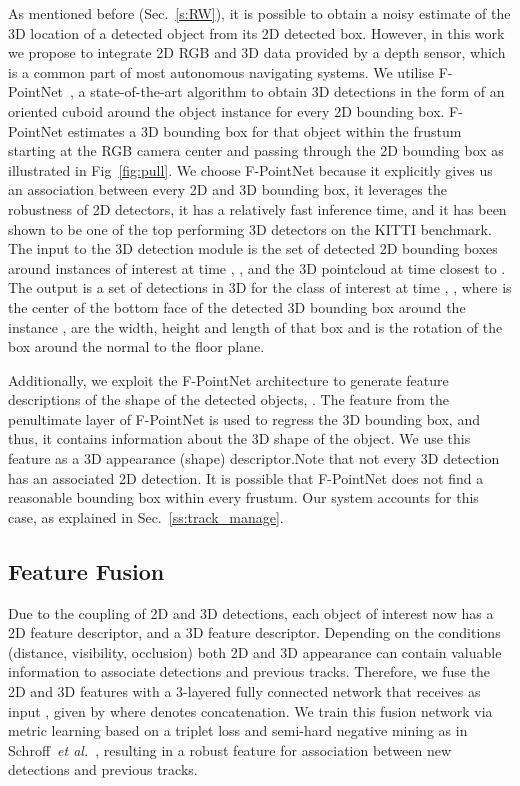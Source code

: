 \documentclass[letterpaper, 10 pt, conference]{ieeeconf}
\newcommand{\etal}{\emph{et al.}\xspace}
\begin{document}
As mentioned before (Sec.~\ref{s:RW}), it is possible to obtain a noisy estimate of the 3D location of a detected object from its 2D detected box. However, in this work we propose to integrate 2D RGB and 3D data provided by a depth sensor, which is a common part of most autonomous navigating systems. 
We utilise F-PointNet~\cite{DBLP:journals/corr/abs-1711-08488}, a state-of-the-art algorithm to obtain 3D detections in the form of an oriented cuboid around the object instance for every 2D bounding box. F-PointNet estimates a 3D bounding box for that object within the frustum starting at the RGB camera center and passing through the 2D bounding box as illustrated in Fig~\ref{fig:pull}. We choose F-PointNet because it explicitly gives us an association between every 2D and 3D bounding box, it leverages the robustness of 2D detectors, it has a relatively fast inference time, and it has been shown to be one of the top performing 3D detectors on the KITTI benchmark.
The input to the 3D detection module is the set of detected 2D bounding boxes around instances of interest at time , , and the 3D pointcloud at time closest to . 
The output is a set of  detections in 3D for the class of interest at time , , where  is the center of the bottom face of the detected 3D bounding box around the instance ,  are the width, height and length of that box and  is the rotation of the box around the normal to the floor plane.

Additionally, we exploit the F-PointNet architecture to generate feature descriptions of the shape of the detected objects, .
The feature from the penultimate layer of F-PointNet is used to regress the 3D bounding box, and thus, it contains information about the 3D shape of the object. We use this feature as a 3D appearance (shape) descriptor.Note that not every 3D detection has an associated 2D detection. It is possible that F-PointNet does not find a reasonable bounding box within every frustum. Our system accounts for this case, as explained in Sec.~\ref{ss:track_manage}.




\subsection{Feature Fusion}
\label{ss:ff}

Due to the coupling of 2D and 3D detections, each object of interest now has a 2D feature descriptor, and a 3D feature descriptor. Depending on the conditions (distance, visibility, occlusion) both 2D and 3D appearance can contain valuable information to associate detections and previous tracks. Therefore, we fuse the 2D and 3D features with a 3-layered fully connected network that receives as input , given by  where  denotes concatenation.
We train this fusion network via metric learning based on a triplet loss and semi-hard negative mining as in Schroff~\etal~\cite{schroff2015facenet}, resulting in a robust feature for association between new detections and previous tracks.
\end{document}
